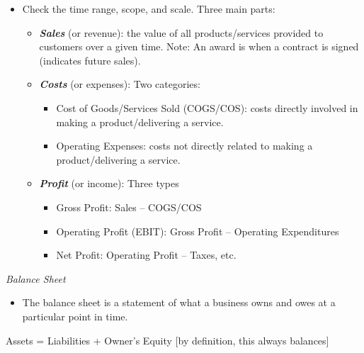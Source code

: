 \documentclass[
]{article}
\providecommand{\tightlist}{%
  \setlength{\itemsep}{0pt}\setlength{\parskip}{0pt}}
\begin{document}
\begin{itemize}
\item
  Check the time range, scope, and scale. Three main parts:

  \begin{itemize}
  \item
    \textbf{\emph{Sales}} (or revenue): the value of all
    products/services provided to customers over a given time. Note: An
    award is when a contract is signed (indicates future sales).
  \item
    \textbf{\emph{Costs}} (or expenses): Two categories:

    \begin{itemize}
    \item
      Cost of Goods/Services Sold (COGS/COS): costs directly involved in
      making a product/delivering a service.
    \item
      Operating Expenses: costs not directly related to making a
      product/delivering a service.
    \end{itemize}
  \item
    \textbf{\emph{Profit}} (or income): Three types

    \begin{itemize}
    \item
      Gross Profit: Sales -- COGS/COS
    \item
      Operating Profit (EBIT): Gross Profit -- Operating Expenditures
    \item
      Net Profit: Operating Profit -- Taxes, etc.
    \end{itemize}
  \end{itemize}
\end{itemize}

\emph{Balance Sheet}

\begin{itemize}
\tightlist
\item
  The balance sheet is a statement of what a business owns and owes at a
  particular point in time.
\end{itemize}

Assets = Liabilities + Owner's Equity {[}by definition, this always
balances{]}
\end{document}
